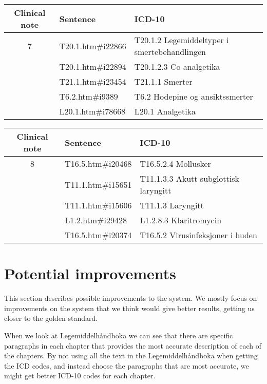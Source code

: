 \begin{table}[htbp]\footnotesize\center
\begin{tabular}{cll}
\toprule
Clinical note & Sentence & ICD-10 \\
\midrule
7 & T20.1.htm\#i22866  & T20.1.2 Legemiddeltyper i smertebehandlingen \\
  & T20.1.htm\#i22894  & T20.1.2.3 Co-analgetika \\
  & T21.1.htm\#i23454  & T21.1.1 Smerter \\
  & T6.2.htm\#i9389    & T6.2 Hodepine og ansiktssmerter \\
  & L20.1.htm\#i78668  & L20.1 Analgetika \\
\bottomrule
\end{tabular}
\end{table}

\begin{table}[htbp]\footnotesize\center
\begin{tabular}{cll}
\toprule
Clinical note & Sentence & ICD-10 \\
\midrule
8 & T16.5.htm\#i20468  & T16.5.2.4 Mollusker \\
  & T11.1.htm\#i15651  & T11.1.3.3 Akutt subglottisk laryngitt \\
  & T11.1.htm\#i15606  & T11.1.3 Laryngitt \\
  & L1.2.htm\#i29428   & L1.2.8.3 Klaritromycin \\
  & T16.5.htm\#i20374  & T16.5.2 Virusinfeksjoner i huden \\
\bottomrule
\end{tabular}
\end{table}


\section{Potential improvements}
\label{sec:potential-improvements}

This section describes possible improvements to the system. We mostly focus on
improvements on the system that we think would give better results, getting us
closer to the golden standard.

When we look at Legemiddelhåndboka we can see that there are specific paragraphs
in each chapter that provides the most accurate description of each of the
chapters. By not using all the text in the Legemiddelhåndboka when getting the
ICD codes, and instead choose the paragraphs that are most accurate, we might
get better ICD-10 codes for each chapter.

